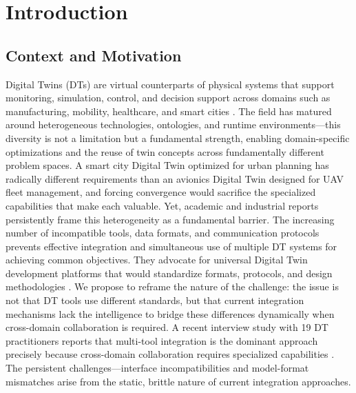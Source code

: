 
\chapter{Introduction}
\label{chap:introduction}

\section{Context and Motivation}


Digital Twins (DTs) are virtual counterparts of physical systems that support monitoring, simulation, control, and decision support across domains such as manufacturing, mobility, healthcare, and smart cities \cite{Zhang_Wang_Cai_Wang_Guo_Zheng_2022}. The field has matured around heterogeneous technologies, ontologies, and runtime environments—this diversity is not a limitation but a fundamental strength, enabling domain-specific optimizations and the reuse of twin concepts across fundamentally different problem spaces. A smart city Digital Twin optimized for urban planning has radically different requirements than an avionics Digital Twin designed for UAV fleet management, and forcing convergence would sacrifice the specialized capabilities that make each valuable.
Yet, academic and industrial reports persistently frame this heterogeneity as a fundamental barrier. The increasing number of incompatible tools, data formats, and communication protocols prevents effective integration and simultaneous use of multiple DT systems for achieving common objectives. They advocate for universal Digital Twin development platforms that would standardize formats, protocols, and design methodologies \cite{Hu_Zhang_Deng_Liu_Tan_2021,Qi_Tao_Hu_Anwer_Liu_Wei_Wang_Nee_2021}. We propose to reframe the nature of the challenge: the issue is not that DT tools use different standards, but that current integration mechanisms lack the intelligence to bridge these differences dynamically when cross-domain collaboration is required. A recent interview study with 19 DT practitioners reports that multi-tool integration is the dominant approach precisely because cross-domain collaboration requires specialized capabilities \cite{Muctadir_2024}. The persistent challenges—interface incompatibilities and model-format mismatches arise from the static, brittle nature of current integration approaches.

